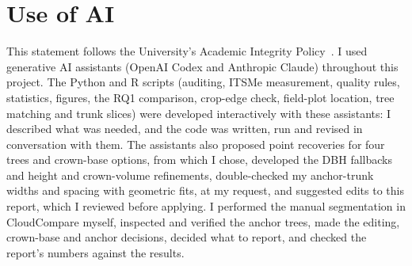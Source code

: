 \documentclass[runningheads]{llncs}
\begin{document}
\section*{Use of AI}
This statement follows the University's Academic Integrity Policy~\cite{info6003}. I used generative AI assistants (OpenAI Codex and Anthropic Claude) throughout this project. The Python and R scripts (auditing, ITSMe measurement, quality rules, statistics, figures, the RQ1 comparison, crop-edge check, field-plot location, tree matching and trunk slices) were developed interactively with these assistants: I described what was needed, and the code was written, run and revised in conversation with them. The assistants also proposed point recoveries for four trees and crown-base options, from which I chose, developed the DBH fallbacks and height and crown-volume refinements, double-checked my anchor-trunk widths and spacing with geometric fits, at my request, and suggested edits to this report, which I reviewed before applying. I performed the manual segmentation in CloudCompare myself, inspected and verified the anchor trees, made the editing, crown-base and anchor decisions, decided what to report, and checked the report's numbers against the results.
\end{document}
